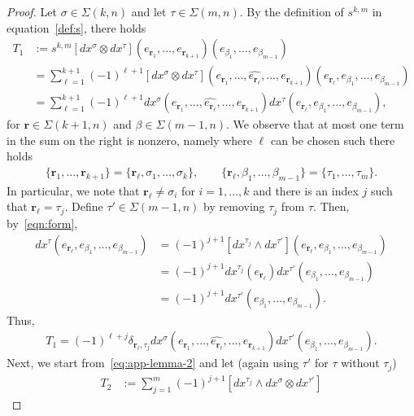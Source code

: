 \documentclass[10pt,a4paper]{amsart}
\newcommand{\br}{\mathbf r}
\begin{document}
\begin{proof}
Let $\sigma\in\Sigma(k,n)$ and let $\tau\in\Sigma(m,n)$.
By the definition of $s^{k,m}$ in equation~\eqref{def:s}, there holds
\begin{align*}
T_1 &:=
    s^{k,m}\left[dx^\sigma\otimes dx^\tau\right]
    (e_{\br_1},\dots,e_{\br_{k+1}})
    (e_{\beta_1},\dots,e_{\beta_{m-1}})\\
    &=\sum_{\ell=1}^{k+1} (-1)^{\ell+1} \left[dx^\sigma\otimes dx^\tau\right]
    (e_{\br_1},\dots,\widehat{e_{\br_\ell}},\dots, e_{\br_{k+1}})
    (e_{\br_\ell},e_{\beta_1},\dots,e_{\beta_{m-1}})\\
    &=\sum_{\ell=1}^{k+1} (-1)^{\ell+1} 
    dx^\sigma (e_{\br_1},\dots,\widehat{e_{\br_\ell}},\dots, e_{\br_{k+1}})
    dx^\tau (e_{\br_\ell},e_{\beta_1},\dots,e_{\beta_{m-1}}),
\end{align*}
for $\br\in\Sigma(k+1,n)$ and $\beta\in\Sigma(m-1,n)$. We observe that at most one term in the sum on the right is nonzero, namely where $\ell$ can be chosen such there holds
\begin{gather}
    \{\br_1,\dots,\br_{k+1}\}
    = \{\br_\ell,\sigma_1,\dots,\sigma_k\},
    \qquad
    \{\br_\ell,\beta_1,\dots,\beta_{m-1}\}
    =\{\tau_1,\dots,\tau_m\}.
\end{gather}
In particular, we note that $\br_\ell\neq\sigma_i$
for $i=1,\dots,k$ and there is an index $j$ such that $\br_\ell = \tau_j$. Define $\tau'\in\Sigma(m-1,n)$ by removing $\tau_j$ from $\tau$. Then, by~\eqref{eqn:form},
\begin{align*}
    dx^\tau(e_{\br_\ell},e_{\beta_1},\dots,e_{\beta_{m-1}})
    &=
    (-1)^{j+1} [dx^{\tau_j}\wedge dx^{\tau'}](e_{\br_\ell},e_{\beta_1},\dots,e_{\beta_{m-1}})\\
    &= (-1)^{j+1} dx^{\tau_j}(e_{\br_\ell})
    dx^{\tau'}(e_{\beta_1},\dots,e_{\beta_{m-1}})\\
    &= (-1)^{j+1}
    dx^{\tau'}(e_{\beta_1},\dots,e_{\beta_{m-1}}).
\end{align*}
Thus,
\begin{gather}
    \label{eq:app-T1-final}
    T_1 = (-1)^{\ell+j} \delta_{\br_\ell,\tau_j}
    dx^\sigma(e_{\br_1},\dots,\widehat{e_{\br_\ell}},\dots, e_{\br_{k+1}})
    dx^{\tau'}(e_{\beta_1},\dots,e_{\beta_{m-1}}).
\end{gather}
Next, we start from~\eqref{eq:app-lemma-2} and let (again using $\tau'$ for $\tau$ without $\tau_j$)
\begin{align*}
    T_2 &:= 
    \sum_{j=1}^m (-1)^{j+1}
    \left[dx^{\tau_j} \wedge dx^\sigma \otimes dx^{\tau'}\right]

\end{align*}
\end{proof}
\end{document}
